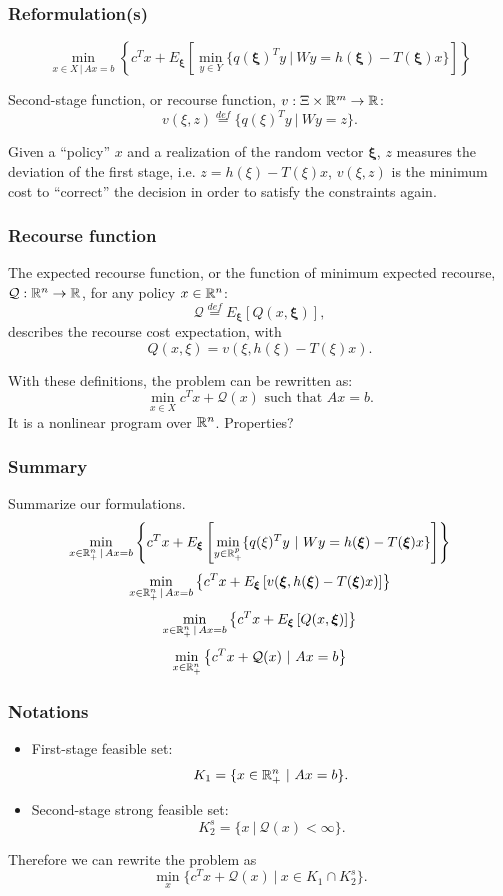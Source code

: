 \documentclass{beamer}
\def\bxi{\boldsymbol\xi}
\def\bxi{\boldsymbol\xi}
\begin{document}
\begin{frame}
\frametitle{Reformulation(s)}

\[
\min_{x \in X \,|\, Ax = b} \left\lbrace c^Tx + E_{\bxi} \left[ \min_{y \in Y} \lbrace q(\bxi)^Ty \ |\ Wy = h(\bxi) - T(\bxi)x \rbrace \right] \right\rbrace 
\]

\mbox{}

{\red Second-stage function}, or {\red recourse function}, $v: \Xi \times {\mathbb{R}}^m \rightarrow {\mathbb{R}}$:
\[
v(\xi, z) \overset{def}{=} \lbrace q(\xi)^Ty \ |\ Wy = z \rbrace.
\]

Given a ``policy'' $x$ and a realization of the random vector $\bxi$, $z$ measures the deviation of the first stage, i.e. $z = h(\xi) - T(\xi)x$, $v(\xi, z)$ is the minimum cost to ``correct'' the decision in order to satisfy the constraints again.

\end{frame}

\begin{frame}
\frametitle{Recourse function}

The {\red expected recourse function}, or the function of minimum expected recourse, $\mathcal{Q}: {\mathbb{R}}^n \rightarrow {\mathbb{R}}$, for any policy $x \in {\mathbb{R}}^n$:
\[
\mathcal{Q} \overset{def}{=} E_{\bxi}[Q(x,\bxi)],
\]
describes the recourse cost expectation, with
\[
Q(x, \xi) = v(\xi, h(\xi)-T(\xi)x).
\]

\mbox{}

With these definitions, the problem can be rewritten as:
\[
\min_{x \in X} c^Tx + \mathcal{Q}(x) \mbox{ such that } Ax = b.
\]
It is a nonlinear program over ${\mathbb{R}}^n$. Properties?
\end{frame}

\begin{frame}
\frametitle{Summary}

Summarize our formulations.
\[
\min_{x \in \RR^n_+ \,|\, Ax = b} \left\lbrace c^Tx + E_{\bxi} \left[ \min_{y \in \RR^p_+} \lbrace q(\xi)^Ty \ |\ Wy = h(\bxi) - T(\bxi)x \rbrace \right] \right\rbrace 
\]
\[
\min_{x \in \RR^n_+ \,|\, Ax = b} \left\lbrace c^Tx + E_{\bxi}
  \left[  v(\bxi, h(\bxi)-T(\bxi)x) \right] \right\rbrace 
\]
\[
\min_{x \in \RR^n_+ \,|\, Ax = b} \left\lbrace c^Tx + E_{\bxi} \left[ Q(x,\bxi) \right] \right\rbrace 
\]
\[
\min_{x \in {\mathbb{R}}^n_+} \left\lbrace c^Tx + \mathcal{Q}(x)
  \ |\ Ax = b \right\rbrace 
\]

\end{frame}

\begin{frame}
\frametitle{Notations}

\begin{itemize}
\item
{\red First-stage feasible set}:
\[
K_1 = \lbrace x \in {\mathbb{R}}^n_+ \ |\ Ax = b \rbrace.
\]
\item
{\red Second-stage strong feasible set}:
\[
K_2^s = \lbrace x \ |\ \mathcal{Q}(x) < \infty \rbrace.
\]
\end{itemize}

\mbox{}

Therefore we can rewrite the problem as
\[
\min_x \lbrace c^Tx + \mathcal{Q}(x) \ |\ x \in K_1 \cap K_2^s \rbrace.
\]

\end{frame}
\end{document}
